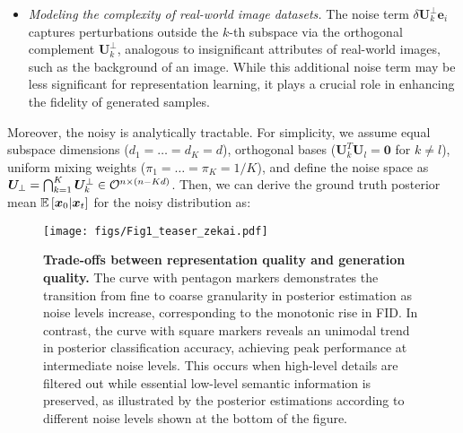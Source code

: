 \begin{itemize}[leftmargin=*]
    \item \emph{Modeling the complexity of real-world image datasets.} The noise term $\delta \bm U_k^{\perp} \bm e_i$ captures perturbations outside the $k$-th subspace via the orthogonal complement $\bm U_k^{\perp}$, analogous to insignificant attributes of real-world images, such as the background of an image. While this additional noise term may be less significant for representation learning, it plays a crucial role in enhancing the fidelity of generated samples. %
\end{itemize}

Moreover, the noisy \MoLRG\; is analytically tractable. For simplicity, we assume equal subspace dimensions ($d_1 = \dots = d_K = d$), orthogonal bases ($\bm U_k^{T} \bm U_l = \bm 0$ for $k \neq l$), uniform mixing weights ($\pi_1 = \dots = \pi_K = 1/K$), and define the noise space as $\bm U_{\perp} = \bigcap_{k=1}^K \bm U_k^{\perp} \in \mathcal{O}^{n \times (n-Kd)}$. Then, we can derive the ground truth posterior mean $\operatorname{\mathbb{E}}\left[\bm x_0 \vert \bm x_t\right]$ for the noisy \MoLRG\; distribution as:


\begin{figure*}[t]
    \begin{center}
    \texttt{[image: figs/Fig1\_teaser\_zekai.pdf]}
    \end{center}
\vspace{-0.1in}
\caption{\textbf{Trade-offs between representation quality and generation quality.} The {\color{c1} curve with pentagon markers} demonstrates the transition from fine to coarse granularity in posterior estimation as noise levels increase, corresponding to the monotonic rise in FID. In contrast, the {\color{c2} curve with square markers} reveals an unimodal trend in posterior classification accuracy, achieving peak performance at intermediate noise levels. This occurs when high-level details are filtered out while essential low-level semantic information is preserved, as illustrated by the posterior estimations according to different noise levels shown at the bottom of the figure.}
\label{fig:use_clean}
\end{figure*}

